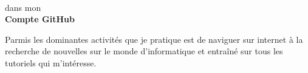 \documentclass[10pt,A4]{article}
\begin{document}
\begin{minipage}{0.59\textwidth}
{		%
		\parbox[b][3cm][c]{3cm}{
			\begin{center}
			\\
			\textcolor{textcol}{dans mon}\\
			\textcolor{textcol}{\textbf{Compte GitHub \\ \faGithub}}
			\end{center}
		}
		
		\parbox[b][3cm][c]{3.5cm}{
			\begin{center}
			\textcolor{textcol}{Parmis les dominantes activités que je pratique est de naviguer sur internet à la recherche de nouvelles sur le monde d'informatique et  entraîné sur tous les tutoriels qui m'intéresse.}
			\end{center}
		}

	}

\end{minipage}
\hspace{5pt}
\begin{minipage}{0.01\textwidth}
	\begin{center}
	\end{center}
\end{minipage}
\end{document}
